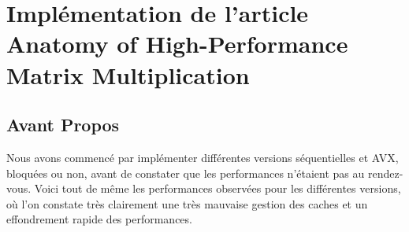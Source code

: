 
\section{Implémentation de l'article Anatomy of High-Performance Matrix
Multiplication}
\subsection{Avant Propos}

Nous avons commencé par implémenter différentes versions séquentielles et AVX,
bloquées ou non, avant de constater que les performances n'étaient pas au
rendez-vous. Voici tout de même les performances observées pour les
différentes versions, où l'on constate très clairement une très mauvaise
gestion des caches et un effondrement rapide des performances.

